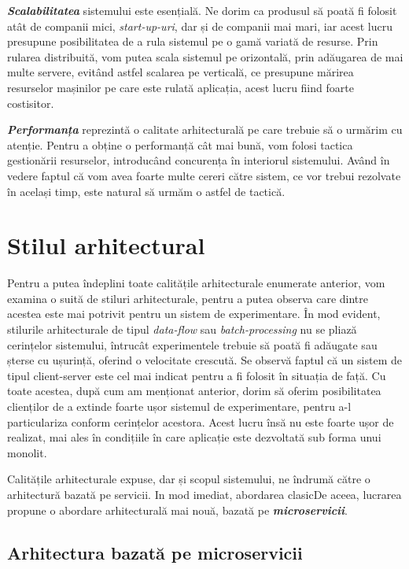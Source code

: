 \textbf{\textit{Scalabilitatea}} sistemului este esențială. Ne dorim ca produsul să poată fi folosit atât de companii mici, \textit{start-up-uri}, dar și de companii mai mari, iar acest lucru presupune posibilitatea de a rula sistemul pe o gamă variată de resurse. Prin rularea distribuită, vom putea scala sistemul pe orizontală, prin adăugarea de mai multe servere, evitând astfel scalarea pe verticală, ce presupune mărirea resurselor mașinilor pe care este rulată aplicația, acest lucru fiind foarte costisitor.

\textbf{\textit{Performanța}} reprezintă o calitate arhitecturală pe care trebuie să o urmărim cu atenție. Pentru a obține o performanță cât mai bună, vom folosi tactica gestionării resurselor, introducând concurența în interiorul sistemului. Având în vedere faptul că vom avea foarte multe cereri către sistem, ce vor trebui rezolvate în același timp, este natural să urmăm o astfel de tactică.  


\section{Stilul arhitectural}

Pentru a putea îndeplini toate calitățile arhitecturale enumerate anterior, vom examina o suită de stiluri arhitecturale, pentru a putea observa care dintre acestea este mai potrivit pentru un sistem de experimentare. În mod evident, stilurile arhitecturale de tipul \textit{data-flow} sau \textit{batch-processing} nu se pliază cerințelor sistemului, întrucât experimentele trebuie să poată fi adăugate sau șterse cu ușurință, oferind o velocitate crescută. Se observă faptul că un sistem de tipul client-server este cel mai indicat pentru a fi folosit în situația de față. Cu toate acestea, după cum am menționat anterior, dorim să oferim posibilitatea clienților de a extinde foarte ușor sistemul de experimentare, pentru a-l particulariza conform cerințelor acestora. Acest lucru însă nu este foarte ușor de realizat, mai ales în condițiile în care aplicație este dezvoltată sub forma unui monolit.

Calitățile arhitecturale expuse, dar și scopul sistemului, ne îndrumă către o arhitectură bazată pe servicii. In mod imediat, abordarea clasicDe aceea, lucrarea propune o abordare arhitecturală mai nouă, bazată pe \textbf{\textit{microservicii}}. 

\subsection{Arhitectura bazată pe microservicii}

